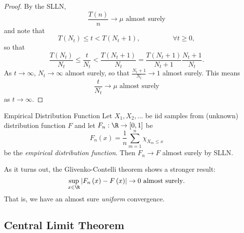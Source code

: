 \documentclass[stat901]{subfiles}
\begin{document}
    \begin{proof}
        By the SLLN,
        \begin{equation*}
            \frac{T\left( n \right)}{n}\to\mu\text{ almost surely}
        \end{equation*}
        and note that
        \begin{equation*}
            T\left( N_t \right) \leq t < T\left( N_t+1 \right), \hspace{2cm}\forall t\geq 0,
        \end{equation*}
        so that
        \begin{equation*}
            \frac{T\left( N_t \right)}{N_t} \leq \frac{t}{N_t} < \frac{T\left( N_t+1 \right)}{N_t} = \frac{T\left( N_t+1 \right)}{N_t+1} \frac{N_t+1}{N_t}.
        \end{equation*}
        As $t\to\infty$, $N_t\to\infty$ almost surely, so that $\frac{N_t+1}{N_t}\to 1$ almost surely. This means
        \begin{equation*}
            \frac{t}{N_t}\to \mu \text{ almost surely}
        \end{equation*}
        as $t\to\infty$.
    \end{proof}
    
    \begin{example}{Empirical Distribution Function}
        Let $X_1,X_2,\ldots$ be iid samples from (unknown) distribution function $F$ and let $F_n:\R\to\left[ 0,1 \right]$ be
        \begin{equation*}
            F_n\left( x \right) = \frac{1}{n} \sum^{n}_{m=1} \chi_{X_m\leq x}
        \end{equation*}
        be the \textit{empirical distribution function}. Then $F_n\to F$ almost surely by SLLN.

        As it turns out, the Glivenko-Contelli theorem shows a stronger result:
        \begin{equation*}
            \sup_{x\in\R} \left| F_n\left( x \right)-F\left( x \right) \right|\to 0\text{ almost surely}.
        \end{equation*}
        That is, we have an almost sure \textit{uniform} convergence.
    \end{example}

    \rruleline

    \subsection{Central Limit Theorem}
\end{document}
